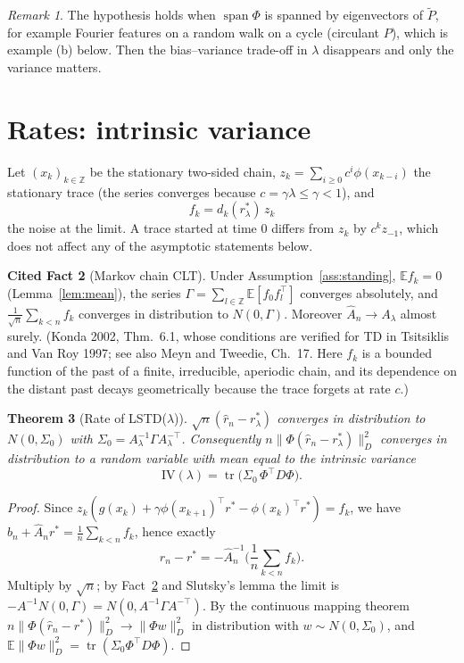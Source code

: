 \documentclass[11pt]{article}
\newtheorem{theorem}{Theorem}[section]
\theoremstyle{definition}
\newtheorem{fact}[theorem]{Cited Fact}
\theoremstyle{remark}
\newtheorem{remark}[theorem]{Remark}
\newcommand{\E}{\mathbb{E}}
\newcommand{\IV}{\mathrm{IV}}
\DeclareMathOperator{\tr}{tr}
\DeclareMathOperator{\spn}{span}
\begin{document}
\begin{remark}
The hypothesis holds when $\spn\Phi$ is spanned by eigenvectors of $\tilde P$, for
example Fourier features on a random walk on a cycle (circulant $P$), which is
example (b) below. Then the bias--variance trade-off in $\lambda$ disappears and only
the variance matters.
\end{remark}

\section{Rates: intrinsic variance}

Let $(x_k)_{k\in\mathbb{Z}}$ be the stationary two-sided chain, $z_k = \sum_{i\ge0}c^i\phi(x_{k-i})$
the stationary trace (the series converges because $c = \gamma\lambda \le \gamma < 1$), and
\[
  f_k = d_k(r^*_\lambda)\, z_k
\]
the noise at the limit. A trace started at time $0$ differs from $z_k$ by
$c^k z_{-1}$, which does not affect any of the asymptotic statements below.

\begin{fact}[Markov chain CLT]\label{fact:clt}
Under Assumption~\ref{ass:standing}, $\E f_k = 0$ (Lemma~\ref{lem:mean}),
the series $\Gamma = \sum_{l\in\mathbb{Z}}\E[f_0 f_l^\top]$ converges absolutely, and
$\frac1{\sqrt n}\sum_{k<n} f_k$ converges in distribution to $N(0,\Gamma)$.
Moreover $\hat A_n \to A_\lambda$ almost surely.
(Konda 2002, Thm.~6.1, whose conditions are verified for TD in Tsitsiklis and Van Roy
1997; see also Meyn and Tweedie, Ch.~17. Here $f_k$ is a bounded function of the past
of a finite, irreducible, aperiodic chain, and its dependence on the distant past
decays geometrically because the trace forgets at rate $c$.)
\end{fact}

\begin{theorem}[Rate of LSTD($\lambda$)]\label{thm:lstd}
$\sqrt n(\hat r_n - r^*_\lambda)$ converges in distribution to $N(0,\Sigma_0)$ with
$\Sigma_0 = A_\lambda^{-1}\Gamma A_\lambda^{-\top}$. Consequently $n\|\Phi(\hat r_n - r^*_\lambda)\|_D^2$ converges in distribution to a
random variable with mean equal to the \emph{intrinsic variance}
\[
  \IV(\lambda) = \tr\!\big(\Sigma_0\,\Phi^\top D\Phi\big).
\]
\end{theorem}
\begin{proof}
Since $z_k(g(x_k) + \gamma\phi(x_{k+1})^\top r^* - \phi(x_k)^\top r^*) = f_k$, we have
$\hat b_n + \hat A_n r^* = \frac1n\sum_{k<n} f_k$, hence exactly
\[
  \hat r_n - r^* = -\hat A_n^{-1}\Big(\frac1n\sum_{k<n} f_k\Big).
\]
Multiply by $\sqrt n$; by Fact~\ref{fact:clt} and Slutsky's lemma the limit is
$-A^{-1}N(0,\Gamma) = N(0, A^{-1}\Gamma A^{-\top})$. By the continuous mapping theorem
$n\|\Phi(\hat r_n - r^*)\|_D^2 \to \|\Phi w\|_D^2$ in distribution with
$w \sim N(0,\Sigma_0)$, and $\E\|\Phi w\|_D^2 = \tr(\Sigma_0\Phi^\top D\Phi)$.
\end{proof}
\end{document}
